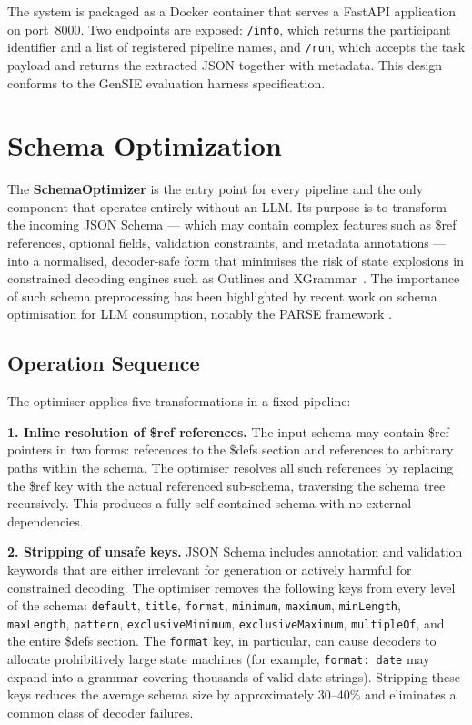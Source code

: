 \documentclass[onecolumn]{ceurart}
\begin{document}
The system is packaged as a Docker container that serves a FastAPI application
on port~8000. Two endpoints are exposed: \texttt{/info}, which returns the
participant identifier and a list of registered pipeline names, and
\texttt{/run}, which accepts the task payload and returns the extracted JSON
together with metadata. This design conforms to the GenSIE evaluation harness
specification.


\section{Schema Optimization}
\label{sec:schema-opt}

The \textbf{SchemaOptimizer} is the entry point for every pipeline and the only
component that operates entirely without an LLM. Its purpose is to transform the
incoming JSON Schema --- which may contain complex features such as \$ref
references, optional fields, validation constraints, and metadata
annotations --- into a normalised, decoder-safe form that minimises the risk of
state explosions in constrained decoding engines such as Outlines
\citep{willard2023efficient} and XGrammar~\citep{dong2025xgrammar}. The
importance of such schema preprocessing has been highlighted by recent work on
schema optimisation for LLM consumption, notably the PARSE framework
\citep{shrimal2025parse}.

\subsection{Operation Sequence}

The optimiser applies five transformations in a fixed pipeline:

\textbf{1. Inline resolution of \$ref references.} The input schema may contain
\$ref pointers in two forms: references to the \$defs section and references to
arbitrary paths within the schema. The optimiser resolves all such references
by replacing the \$ref key with the actual referenced sub-schema, traversing
the schema tree recursively. This produces a fully self-contained schema with
no external dependencies.

\textbf{2. Stripping of unsafe keys.} JSON Schema includes annotation and
validation keywords that are either irrelevant for generation or actively
harmful for constrained decoding. The optimiser removes the following keys from
every level of the schema: \texttt{default}, \texttt{title}, \texttt{format},
\texttt{minimum}, \texttt{maximum}, \texttt{minLength}, \texttt{maxLength},
\texttt{pattern}, \texttt{exclusiveMinimum}, \texttt{exclusiveMaximum},
\texttt{multipleOf}, and the entire \$defs section. The \texttt{format} key, in
particular, can cause decoders to allocate prohibitively large state machines
(for example, \texttt{format: date} may expand into a grammar covering
thousands of valid date strings). Stripping these keys reduces the average
schema size by approximately 30--40\% and eliminates a common class of decoder
failures.
\end{document}
